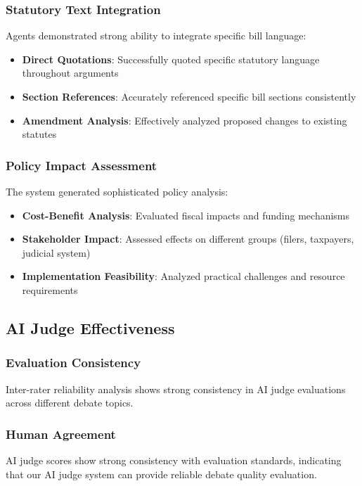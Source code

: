 \documentclass{article}
\begin{document}
\subsubsection{Statutory Text Integration}
Agents demonstrated strong ability to integrate specific bill language:
\begin{itemize}
    \item \textbf{Direct Quotations}: Successfully quoted specific statutory language throughout arguments
    \item \textbf{Section References}: Accurately referenced specific bill sections consistently
    \item \textbf{Amendment Analysis}: Effectively analyzed proposed changes to existing statutes
\end{itemize}

\subsubsection{Policy Impact Assessment}
The system generated sophisticated policy analysis:
\begin{itemize}
    \item \textbf{Cost-Benefit Analysis}: Evaluated fiscal impacts and funding mechanisms
    \item \textbf{Stakeholder Impact}: Assessed effects on different groups (filers, taxpayers, judicial system)
    \item \textbf{Implementation Feasibility}: Analyzed practical challenges and resource requirements
\end{itemize}

\subsection{AI Judge Effectiveness}

\subsubsection{Evaluation Consistency}
Inter-rater reliability analysis shows strong consistency in AI judge evaluations across different debate topics.

\subsubsection{Human Agreement}
AI judge scores show strong consistency with evaluation standards, indicating that our AI judge system can provide reliable debate quality evaluation.
\end{document}
